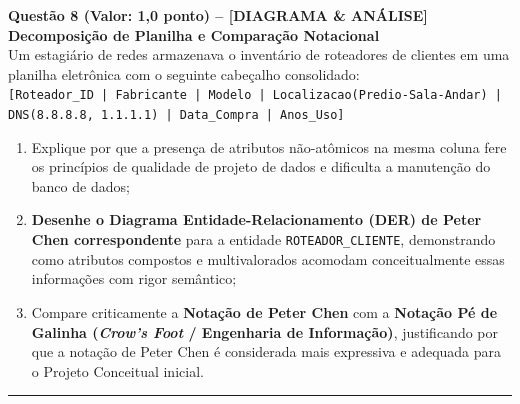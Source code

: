 \documentclass[11pt,a4paper]{article}
\begin{document}
\vspace{0.4cm}
\noindent\textbf{Questão 8 (Valor: 1,0 ponto) -- [DIAGRAMA \& ANÁLISE] Decomposição de Planilha e Comparação Notacional}\\[0.1cm]
Um estagiário de redes armazenava o inventário de roteadores de clientes em uma planilha eletrônica com o seguinte cabeçalho consolidado:\\
\texttt{[Roteador\_ID | Fabricante | Modelo | Localizacao(Predio-Sala-Andar) | DNS(8.8.8.8, 1.1.1.1) | Data\_Compra | Anos\_Uso]}
\begin{enumerate}[label=\alph*),itemsep=1pt]
  \item Explique por que a presença de atributos não-atômicos na mesma coluna fere os princípios de qualidade de projeto de dados e dificulta a manutenção do banco de dados;
  \item \textbf{Desenhe o Diagrama Entidade-Relacionamento (DER) de Peter Chen correspondente} para a entidade \texttt{ROTEADOR\_CLIENTE}, demonstrando como atributos compostos e multivalorados acomodam conceitualmente essas informações com rigor semântico;
  \item Compare criticamente a \textbf{Notação de Peter Chen} com a \textbf{Notação Pé de Galinha (\textit{Crow's Foot} / Engenharia de Informação)}, justificando por que a notação de Peter Chen é considerada mais expressiva e adequada para o Projeto Conceitual inicial.
\end{enumerate}

\vspace{0.4cm}
\hrule
\vspace{0.3cm}
\end{document}
